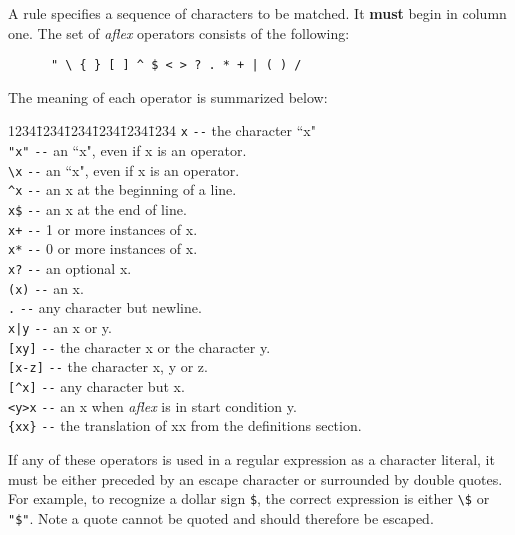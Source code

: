 \mysk
A rule specifies a  sequence of  characters  to  be  matched. It 
{\bf must} begin in column one. 
The set of {\sl aflex} operators consists of 
the following:

\begin{verbatim}
      " \ { } [ ] ^ $ < > ? . * + | ( ) /   
\end{verbatim}

The meaning of each operator is summarized below:

\begin{tabbing}
1234\=1234\=1234\=1234\=1234\=1234 \kill
  \>\verb|x|     \>\>\verb|--| the character ``x" \\
  \>\verb|"x"|   \>\>\verb|--| an ``x", even if x is an operator. \\
  \>\verb|\x|    \>\>\verb|--| an ``x", even if x is an operator. \\
  \>\verb|^x|    \>\>\verb|--| an x at the beginning of a line. \\
  \>\verb|x$|    \>\>\verb|--| an x at the end of line. \\
  \>\verb|x+|    \>\>\verb|--| 1 or more instances of x. \\
  \>\verb|x*|    \>\>\verb|--| 0 or more instances of x. \\
  \>\verb|x?|    \>\>\verb|--| an optional x. \\
  \>\verb|(x)|   \>\>\verb|--| an x. \\
  \>\verb|.|     \>\>\verb|--| any character but newline. \\
  \>\verb"x|y"   \>\>\verb|--| an x or y. \\
  \>\verb|[xy]|  \>\>\verb|--| the character x or the character y. \\
  \>\verb|[x-z]| \>\>\verb|--| the character x, y or z. \\
  \>\verb|[^x]|  \>\>\verb|--| any character but x. \\
  \>\verb|<y>x|  \>\>\verb|--| an x when {\sl aflex} is in start condition y. \\
  \>\verb|{xx}|  \>\>\verb|--| the translation of xx from the definitions section. \\
\end{tabbing}

If any of these operators is used in a regular expression as a character
literal, it must be either preceded by an escape character or surrounded by
double quotes.  For example, to recognize a dollar sign \verb|$|, the correct
expression is either \verb|\$| or \verb|"$"|.
Note a quote cannot be quoted and should therefore be escaped.

